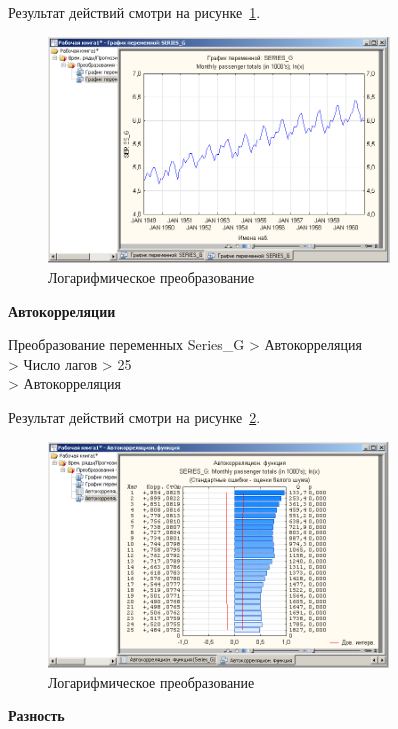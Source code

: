 Результат действий смотри на рисунке~\ref{fig:4}.

\begin{figure}[!h]
  \centering

  \includegraphics[height=6cm]
  {inc/4.PNG}

  \caption{Логарифмическое преобразование}

  \label{fig:4}
\end{figure}

\begin{center}
  \textbf{Автокорреляции}
\end{center}

Преобразование переменных Series\_G > Автокорреляция\\
> Число лагов > 25\\
> Автокорреляция

Результат действий смотри на рисунке~\ref{fig:5}.

\begin{figure}[!h]
  \centering

  \includegraphics[height=6cm]
  {inc/5.PNG}

  \caption{Логарифмическое преобразование}

  \label{fig:5}
\end{figure}

\newpage

\begin{center}
  \textbf{Разность}
\end{center}

